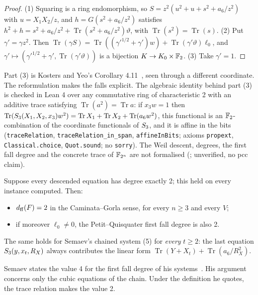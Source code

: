 \begin{proof}
(1) Squaring is a ring endomorphism, so
$S=z^2(u^2+u+s^2+a_6/z^2)$ with $u=X_1X_2/z$, and
$h=G(s^2+a_6/z^2)$ satisfies
$h^2+h=s^2+a_6/z^2+\operatorname{Tr}(s^2+a_6/z^2)\vartheta$, with
$\operatorname{Tr}(s^2)=\operatorname{Tr}(s)$.
(2) Put $\gamma'=\gamma z^2$. Then
$\operatorname{Tr}(\gamma S)=\operatorname{Tr}((\gamma'^{1/2}+\gamma')w)+\operatorname{Tr}(\gamma'\vartheta)\ell_0$,
and $\gamma'\mapsto(\gamma'^{1/2}+\gamma',\operatorname{Tr}(\gamma'\vartheta))$
is a bijection $K\to K_0\times\mathbb{F}_2$.
(3) Take $\gamma'=1$.
\end{proof}

Part (3) is Kosters and Yeo's Corollary 4.11~\cite{kosters2015notes}, seen
through a different coordinate. The reformulation makes the falls
explicit. The algebraic identity behind part (3) is checked in Lean 4 over
any commutative ring of characteristic 2 with an additive trace satisfying
$\operatorname{Tr}(a^2)=\operatorname{Tr}a$: if $x_3w=1$ then
$\operatorname{Tr}(S_{3}(X_1,X_2,x_3)w^2)=\operatorname{Tr}X_1+\operatorname{Tr}X_2+\operatorname{Tr}(a_6w^2)$,
this functional is an $\mathbb{F}_2$-combination of the coordinate functionals of
$S_{3}$, and it is affine in the bits (\texttt{traceRelation},
\texttt{traceRelation\_in\_span}, \texttt{affineInBits}; axioms
\texttt{propext}, \texttt{Classical.choice}, \texttt{Quot.sound}; no
\texttt{sorry}). The Weil descent, degrees, the first fall degree and the
concrete trace of $\mathbb{F}_{2^n}$ are not formalised
(; unverified,
no pcc claim).

\begin{corollary}\label{cor:ffd2}
Suppose every descended equation has degree exactly 2; this held on
every instance computed. Then:
\begin{itemize}
\item $d_{\rm ff}(F)=2$ in the Caminata--Gorla sense, for every $n\ge3$
  and every $V$;
\item if moreover $\ell_0\ne0$, the Petit--Quisquater first fall degree
  is also 2.
\end{itemize}
The same holds for Semaev's chained system (5) for \emph{every} $t\ge2$:
the last equation $S_{3}(y,x_t,R_X)$ always contributes the linear form
$\operatorname{Tr}(Y+X_t)+\operatorname{Tr}(a_6/R_X^2)$.
\end{corollary}

Semaev states the value 4 for the first fall degree of his
systems~\cite[\S4.5]{semaev2015}. His argument concerns only the cubic
equations of the chain. Under the definition he quotes, the trace relation
makes the value 2.

